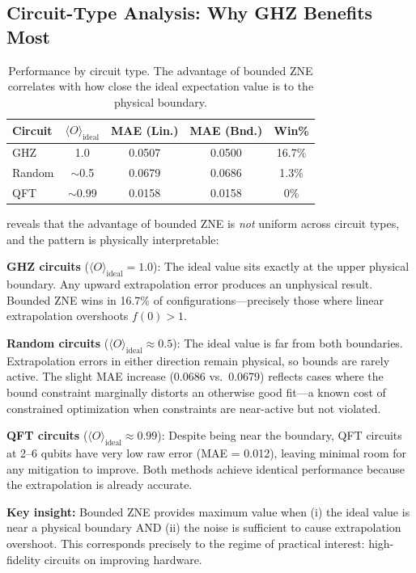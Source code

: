 \subsection{Circuit-Type Analysis: Why GHZ Benefits Most}

\begin{table}[!htbp]
\caption{Performance by circuit type. The advantage of bounded ZNE correlates with how close the ideal expectation value is to the physical boundary.}
\label{tab:circuit}
\begin{ruledtabular}
\begin{tabular}{lcccc}
Circuit & $\langle O \rangle_\text{ideal}$ & MAE (Lin.) & MAE (Bnd.) & Win\% \\
\hline
GHZ & 1.0 & 0.0507 & 0.0500 & 16.7\% \\
Random & $\sim$0.5 & 0.0679 & 0.0686 & 1.3\% \\
QFT & $\sim$0.99 & 0.0158 & 0.0158 & 0\% \\
\end{tabular}
\end{ruledtabular}
\end{table}

 reveals that the advantage of bounded ZNE is \emph{not} uniform across circuit types, and the pattern is physically interpretable:

\textbf{GHZ circuits} ($\langle O \rangle_\text{ideal} = 1.0$): The ideal value sits exactly at the upper physical boundary. Any upward extrapolation error produces an unphysical result. Bounded ZNE wins in 16.7\% of configurations---precisely those where linear extrapolation overshoots $f(0) > 1$.

\textbf{Random circuits} ($\langle O \rangle_\text{ideal} \approx 0.5$): The ideal value is far from both boundaries. Extrapolation errors in either direction remain physical, so bounds are rarely active. The slight MAE increase (0.0686 vs.\ 0.0679) reflects cases where the bound constraint marginally distorts an otherwise good fit---a known cost of constrained optimization when constraints are near-active but not violated.

\textbf{QFT circuits} ($\langle O \rangle_\text{ideal} \approx 0.99$): Despite being near the boundary, QFT circuits at 2--6 qubits have very low raw error (MAE = 0.012), leaving minimal room for any mitigation to improve. Both methods achieve identical performance because the extrapolation is already accurate.

\textbf{Key insight:} Bounded ZNE provides maximum value when (i) the ideal value is near a physical boundary AND (ii) the noise is sufficient to cause extrapolation overshoot. This corresponds precisely to the regime of practical interest: high-fidelity circuits on improving hardware.

